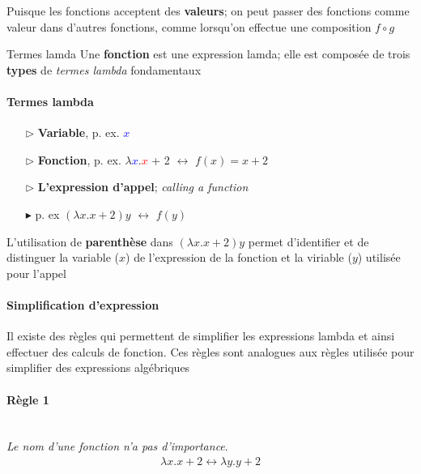 \documentclass{report}
\begin{document}
\begin{multicols*}{3}
    \begin{Concept}{}{}
        Puisque les fonctions acceptent des \textbf{valeurs}; on peut 
        passer des fonctions comme valeur dans d'autres fonctions, comme 
        lorsqu'on effectue une composition $f \circ g$
    \end{Concept}

    \begin{Definitionx}{Termes lamda}{}
        Une \textbf{fonction} est une expression lamda; elle est composée 
        de trois \textbf{types} de \textit{termes lambda} fondamentaux    
    \end{Definitionx}

    \paragraph{Termes lambda}

    \begin{itemize}
      \item [$\rhd$ ] \textbf{Variable}, p. ex. \textcolor{blue}{$x$}  
      \item [$\rhd$ ] \textbf{Fonction}, p. ex. 
        $\lambda$\textcolor{blue}{$x$}\textcolor{myp}{$.$}\textcolor{red}{$x$} +
        2        $\leftrightarrow$ $f(x) = x + 2$ 
      \item [$\rhd$ ] \textbf{L'expression d'appel}; \textit{calling a function}  
      \item [$\blacktriangleright$ ] p. ex $(\lambda x.x+2)y$ $\leftrightarrow$ $f(y)$

    \end{itemize}

    \begin{note}{}{}
      L'utilisation de \textbf{parenthèse} dans $(\lambda x.x+2)y$ 
      permet d'identifier
        et de distinguer
        la variable ($x$) de l'expression de la fonction et la viriable 
        ($y$) utilisée pour l'appel
    \end{note}

    \paragraph{Simplification d'expression}
    Il existe des règles qui permettent de simplifier les expressions 
    lambda et ainsi effectuer des calculs de fonction. Ces règles 
    sont analogues aux règles utilisée pour simplifier des expressions 
    algébriques

    \paragraph{Règle 1}
    \mbox{}\\
    \textit{Le nom d'une fonction n'a pas d'importance}.  
    \begin{align*}
        \lambda x.x+2 \leftrightarrow \lambda y.y+2
    \end{align*}


\end{multicols*}
\end{document}
